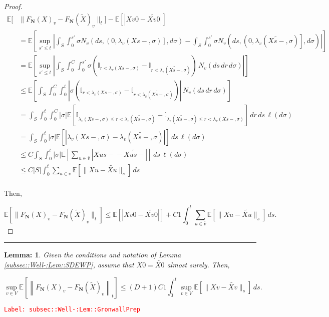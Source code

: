 \documentclass[12pt]{article}
\newcommand{\mb}{\mathbb}
\newcommand{\ov}{\overline}
\newcommand{\tr}{\textcolor{red}}
\newcommand{\labe}[1]{\tr{\texttt{Label: #1}}}
\newcommand{\lin}{\rule{\linewidth}{0.4 pt}}
\newcommand{\ex}[1]{\mb{E}\left[#1\right]}			%
\renewcommand{\v}{v}							%
\newcommand{\vv}{u}								%
\renewcommand{\S}{S}							%
\newcommand{\s}{\sigma}							%
\renewcommand{\t}{t}							%
\renewcommand{\tt}{s}							%
\newcommand{\ttt}{s'}							%
\newcommand{\X}{X}								%
\newcommand{\cl}{\ov}							%
\newcommand{\const}{C}							%
\newcommand{\degr}{D}							%
\newcommand{\poiss}[1]{N_{#1}}						%
\newcommand{\poisses}{\mathbf{N}}				%
\renewcommand{\r}{r}								%
\newcommand{\rate}[1]{\lambda_{#1}}					%
\newcommand{\Sm}{\ell}								%
\newcommand{\alt}{\widetilde}						%
\newtheorem{lem}[thms]{Lemma: }
\begin{document}
\begin{proof}
\begin{align*}
\mb{E}\bigg[&\|F_\poisses(\X{}{})_\v - F_\poisses(\alt{\X{}{}})_\v\|_\t\bigg] - \ex{|\X{\v}{0} - \alt{\X{\v}{0}}|}\\
&= \ex{\sup_{\ttt \leq \t}\left|\int_\S\int_0^{\ttt} \s\poiss{\v}\left(d\tt,\left(0,\rate{\v}(\X{}{\tt-},\s)\right],d\s\right) -  \int_\S\int_0^{\ttt} \s\poiss{\v}\left(d\tt,\left(0,\rate{\v}(\alt{\X{}{\tt-}},\s)\right],d\s\right)\right|}\\
&=\ex{\sup_{\ttt\leq \t} \left|\int_\S \int_0^{\const{}} \int_0^{\ttt} \s\left(\mb{I}_{\r < \rate{\v}(\X{}{\tt-},\s)} - \mb{I}_{\r < \rate{\v}(\alt{\X{}{\tt-}},\s)}\right)\,\poiss{\v}(d\tt\,d\r\,d\s)\right|}\\
&\leq \ex{\int_\S\int_0^{\const{}}\int_0^\t \left|\s\left(\mb{I}_{\r < \rate{\v}(\X{}{\tt-},\s)} - \mb{I}_{\r < \rate{\v}(\alt{\X{}{\tt-}},\s)}\right)\right|\,\poiss{\v}(d\tt\,d\r\,d\s)}\\
&=\int_\S\int_0^\t\int_0^{\const{}} |\s|\ex{\mb{I}_{\rate{\v}(\X{}{\tt-},\s) \leq \r < \rate{\v}(\alt{\X{}{\tt-}},\s)} + \mb{I}_{\rate{\v}(\alt{\X{}{\tt-}},\s) \leq \r < \rate{\v}(\X{}{\tt-},\s)}}\,d\r\,d\tt\,\Sm(d\s)\\
&= \int_\S\int_0^\t|\s|\ex{\left|\rate{\v}(\X{}{\tt-},\s) - \rate{\v}(\alt{\X{}{\tt-}},\s)\right|}\,d\tt\,\Sm(d\s)\\
&\leq \const{}\int_\S\int_0^\t |\s| \ex{\sum_{\vv \in \cl{\v}}|\X{\vv}{\tt-} - \alt{\X{\vv}{\tt-}}|}\,d\tt\,\Sm(d\s)\\
&\leq \const{}|\S|\int_0^\t \sum_{\vv \in \cl{\v}}\ex{\|\X{\vv}{} - \alt{\X{\vv}{}}\|_\tt}\,d\tt\\
\end{align*}

Then,

\[\ex{\|F_\poisses(\X{}{})_\v - F_\poisses(\alt{\X{}{}})_\v\|_\t} \leq \ex{|\X{\v}{0} - \alt{\X{\v}{0}}|} +  \const{1}\int_0^\t \sum_{\vv\in \cl{\v}} \ex{\|\X{\vv}{} - \alt{\X{\vv}{}}\|_\tt}\,d\tt.\]

\end{proof}

\lin

\begin{lem}
Given the conditions and notation of Lemma \ref{subsec::Well-:Lem::SDEWP}, assume that \(\X{}{0} = \alt{\X{}{0}}\) almost surely. Then,

\[\sup_{\v \in  V} \ex{\left\|F_\poisses(\X{}{})_\v - F_\poisses(\alt{\X{}{}})_\v\right\|_\t} \leq (\degr+1)\const{1}\int_0^\t \sup_{\v \in  V} \ex{\|\X{\v}{} - \alt{\X{\v}{}}\|_\tt}\,d\tt.\]
\label{subsec::Well-:Lem::GronwallPrep}
\end{lem}
\labe{subsec::Well-:Lem::GronwallPrep}
\end{document}
